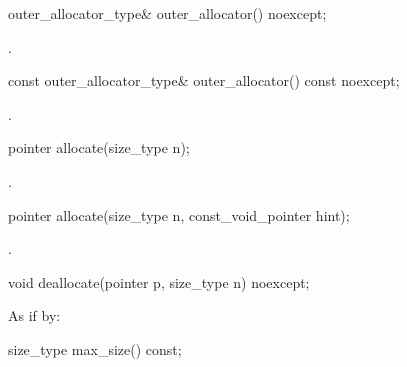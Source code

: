 %
\begin{itemdecl}
outer_allocator_type& outer_allocator() noexcept;
\end{itemdecl}

\begin{itemdescr}
\pnum
\returns {}.
\end{itemdescr}

%
\begin{itemdecl}
const outer_allocator_type& outer_allocator() const noexcept;
\end{itemdecl}

\begin{itemdescr}
\pnum
\returns {}.
\end{itemdescr}

%
\begin{itemdecl}
pointer allocate(size_type n);
\end{itemdecl}

\begin{itemdescr}
\pnum
\returns {}.
\end{itemdescr}

%
\begin{itemdecl}
pointer allocate(size_type n, const_void_pointer hint);
\end{itemdecl}

\begin{itemdescr}
\pnum
\returns {}.
\end{itemdescr}

%
\begin{itemdecl}
void deallocate(pointer p, size_type n) noexcept;
\end{itemdecl}

\begin{itemdescr}
\pnum
\effects As if by:
\end{itemdescr}

%
\begin{itemdecl}
size_type max_size() const;
\end{itemdecl}

